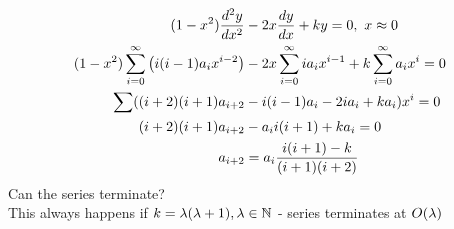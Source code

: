 \documentclass[Maths.tex]{subfiles}
\begin{document}
\begin{example}
\begin{align*}
    (1-x^2)\frac{d^2 y}{dx^2} &- 2x\frac{dy}{dx} + ky = 0,~ x \approx 0 \\
    (1-x^2)\sum_{i=0}^\infty \left(i(i-1)a_ix^{i-2}\right) &- 2x\sum_{i=0}^\infty ia_ix^{i-1} + k\sum_{i=0}^\infty a_ix^i = 0 \\
    \sum((i+2)(i+1)a_{i+2} &- i(i-1)a_i - 2ia_i + ka_i)x^i = 0 \\
    (i+2)(i+1)a_{i+2} &- a_ii(i+1) + ka_i = 0 \\
    a_{i+2} &= a_i \frac{i(i+1)-k}{(i+1)(i+2)}
\end{align*}
Can the series terminate? \\
This always happens if $k = \lambda(\lambda+1), \lambda \in \mathbb{N}$ - series terminates at $O(\lambda)$
\end{example}
\end{document}
